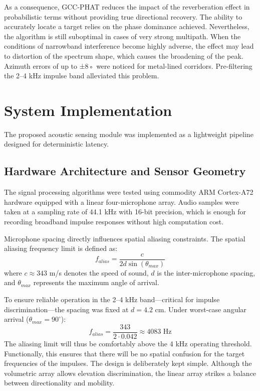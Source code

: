\documentclass[conference]{IEEEtran}
\begin{document}
As a consequence, GCC-PHAT reduces the impact of the reverberation effect in probabilistic terms without providing true directional recovery. The ability to accurately locate a target relies on the phase dominance achieved. Nevertheless, the algorithm is still suboptimal in cases of very strong multipath. When the conditions of narrowband interference become highly adverse, the effect may lead to distortion of the spectrum shape, which causes the broadening of the peak. Azimuth errors of up to ±8◦ were noticed for metal-lined corridors. Pre-filtering the 2–4 kHz impulse band alleviated this problem.

\section{System Implementation}

The proposed acoustic sensing module was implemented as a lightweight pipeline designed for deterministic latency.

\subsection{Hardware Architecture and Sensor Geometry}
The signal processing algorithms were tested using commodity ARM Cortex-A72 hardware equipped with a linear four-microphone array. Audio samples were taken at a sampling rate of 44.1 kHz with 16-bit precision, which is enough for recording broadband impulse responses without high computation cost.

Microphone spacing directly influences spatial aliasing constraints. The spatial aliasing frequency limit is defined as:
\begin{equation}
f_{alias} = \frac{c}{2d \sin(\theta_{max})}
\end{equation}
where $c \approx 343$ m/s denotes the speed of sound, $d$ is the inter-microphone spacing, and $\theta_{max}$ represents the maximum angle of arrival.

To ensure reliable operation in the 2–4 kHz band—critical for impulse discrimination—the spacing was fixed at $d = 4.2$ cm. Under worst-case angular arrival ($\theta_{max} = 90^\circ$):
\begin{equation}
f_{alias} = \frac{343}{2 \cdot 0.042} \approx 4083 \text{ Hz}
\end{equation}
The aliasing limit will thus be comfortably above the 4 kHz operating threshold. Functionally, this ensures that there will be no spatial confusion for the target frequencies of the impulses. The design is deliberately kept simple. Although the volumetric array allows elevation discrimination, the linear array strikes a balance between directionality and mobility.
\end{document}
